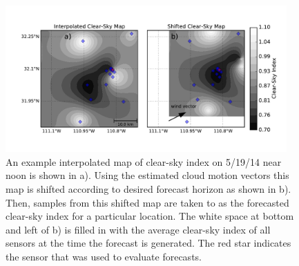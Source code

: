 \begin{figure}[h]
\centering
\includegraphics[width=0.96\textwidth]{figs/clearmap.pdf}
\caption{An example interpolated map of clear-sky index on 5/19/14 near noon is shown in a). Using the estimated cloud motion vectors this map is shifted according to desired forecast horizon as shown in b). Then, samples from this shifted map are taken to as the forecasted clear-sky index for a particular location. The white space at bottom and left of b) is filled in with the average clear-sky index of all sensors at the time the forecast is generated. The red star indicates the sensor that was used to evaluate forecasts.}
\label{fig:clearmap}
\end{figure}

